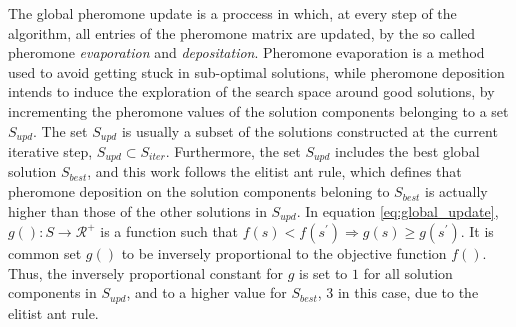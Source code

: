 The global pheromone update is a proccess in which, at every step of the algorithm,
all entries of the pheromone matrix are updated, by the so called pheromone \textit{evaporation} and \textit{depositation}.
Pheromone evaporation is a method used to avoid getting stuck in sub-optimal solutions,
while pheromone deposition intends to induce the exploration of the search space around good solutions,
by incrementing the pheromone values of the solution components belonging to a set $S_{upd}$.
The set $S_{upd}$ is usually a subset of the solutions constructed at the current iterative step,
$S_{upd} \subset S_{iter}$.
Furthermore, the set $S_{upd}$ includes the best global solution $S_{best}$,
and this work follows the elitist ant rule, which defines that pheromone deposition on the solution 
components beloning to $S_{best}$ is actually higher than those of the other solutions in $S_{upd}$.
In equation \ref{eq:global_update}, $g(): S \rightarrow \mathcal{R}^+$ is a function such that $f(s) < f(s^{'}) \Rightarrow g(s) \geq g(s^{'})$.
It is common set $g()$ to be inversely proportional to the objective function $f()$.
Thus, the inversely proportional constant for $g$ is set to $1$ for all solution components in $S_{upd}$,
and to a higher value for $S_{best}$, 3 in this case, due to the elitist ant rule.






